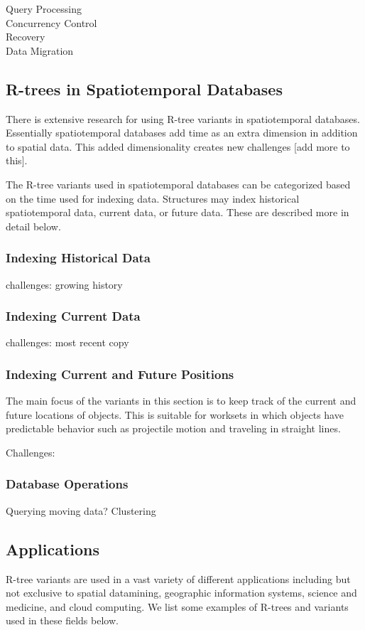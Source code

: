 \begin{description}
	\item[Query Processing]
	\item[Concurrency Control]
	\item[Recovery]
	\item[Data Migration]
\end{description}

\subsection{R-trees in Spatiotemporal Databases}
There is extensive research for using R-tree variants in spatiotemporal
databases. Essentially spatiotemporal databases add time as an extra dimension
in addition to spatial data. This added dimensionality creates new challenges
[add more to this]. 

The R-tree variants used in spatiotemporal databases can be categorized based
on the time used for indexing data. Structures may index historical 
spatiotemporal data, current data, or future data. These are described more
in detail below.

\subsubsection{Indexing Historical Data}
challenges: growing history


\subsubsection{Indexing Current Data}
challenges: most recent copy

\subsubsection{Indexing Current and Future Positions}
The main focus of the variants in this section is to keep track of the current
and future locations of objects. This is suitable for worksets in which 
objects have predictable behavior such as projectile motion and traveling in
straight lines.

Challenges:

\subsubsection{Database Operations}
Querying moving data?
Clustering


\subsection{Applications}
R-tree variants are used in a vast variety of different applications including
but not exclusive to spatial datamining, geographic information systems, 
science and medicine, and cloud computing. We list some examples of R-trees
and variants used in these fields below.

